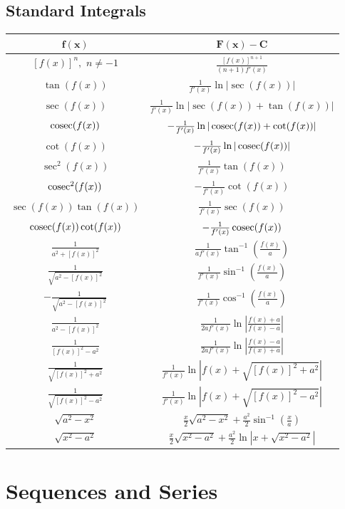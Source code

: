 \documentclass[12pt, a4paper]{article}
\begin{document}
\begin{multicols*}{3}
\subsection{Standard Integrals}
{\centering
\begin{tabular}{|c|c|}
\hline
$\mathbf{f(x)}$ & $\mathbf{F(x) - C}$ \\ \hline
$[f(x)]^n,$ $n\neq -1$ & $\frac{[f(x)]^{n+1}}{(n+1)f'(x)} $\\ \hline
$\tan(f(x))$ & $\frac{1}{f'(x)}\ln|\sec(f(x))| $ \\ \hline
$\sec(f(x))$ & $\frac{1}{f'(x)}\ln|\sec(f(x)) + \tan(f(x))| $ \\ \hline
$\operatorname{cosec}(f(x))$ & $-\frac{1}{f'(x)}\ln|\operatorname{cosec}(f(x)) + \cot(f(x))| $ \\ \hline
$\cot(f(x))$ & $-\frac{1}{f'(x)}\ln|\operatorname{cosec}(f(x))| $ \\ \hline
$\sec^2(f(x))$ & $\frac{1}{f'(x)}\tan(f(x)) $ \\ \hline
$\operatorname{cosec}^2(f(x))$ & $-\frac{1}{f'(x)}\cot(f(x)) $ \\ \hline
$\sec(f(x))\tan(f(x))$ & $\frac{1}{f'(x)}\sec(f(x)) $ \\ \hline
$\operatorname{cosec}(f(x))\cot(f(x))$ & $-\frac{1}{f'(x)}\operatorname{cosec}(f(x)) $ \\ \hline
$\frac{1}{a^2+[f(x)]^2}$ & $\frac{1}{af'(x)}\tan^{-1}(\frac{f(x)}{a})$ \\ \hline
$\frac{1}{\sqrt{a^2-[f(x)]^2}}$ & $\frac{1}{f'(x)}\sin^{-1}(\frac{f(x)}{a})$ \\ \hline
$-\frac{1}{\sqrt{a^2-[f(x)]^2}}$ & $\frac{1}{f'(x)}\cos^{-1}(\frac{f(x)}{a})$ \\ \hline
$\frac{1}{a^2-[f(x)]^2}$ & $\frac{1}{2af'(x)}\ln|\frac{f(x)+a}{f(x)-a}|$ \\ \hline
$\frac{1}{[f(x)]^2-a^2}$ & $\frac{1}{2af'(x)}\ln|\frac{f(x)-a}{f(x)+a}|$ \\ \hline
$\frac{1}{\sqrt{[f(x)]^2+a^2}}$ & $\frac{1}{f'(x)}\ln|f(x)+\sqrt{[f(x)]^2+a^2}|$ \\ \hline
$\frac{1}{\sqrt{[f(x)]^2-a^2}}$ & $\frac{1}{f'(x)}\ln|f(x)+\sqrt{[f(x)]^2-a^2}|$ \\ \hline
$\sqrt{a^2-x^2}$ & $\frac{x}{2}\sqrt{a^2-x^2}+\frac{a^2}{2}\sin^{-1}(\frac{x}{a})$ \\ \hline
$\sqrt{x^2-a^2}$ & $\frac{x}{2}\sqrt{x^2-a^2}+\frac{a^2}{2}\ln|x+\sqrt{x^2-a^2}|$ \\ \hline
\end{tabular}
\par}
\section{Sequences and Series}


\end{multicols*}
\end{document}
